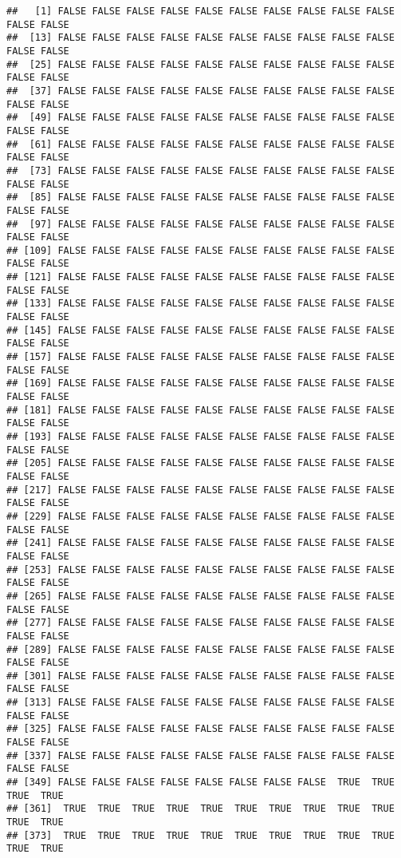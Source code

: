 \documentclass[
]{article}
\begin{document}
\begin{verbatim}
##   [1] FALSE FALSE FALSE FALSE FALSE FALSE FALSE FALSE FALSE FALSE FALSE FALSE
##  [13] FALSE FALSE FALSE FALSE FALSE FALSE FALSE FALSE FALSE FALSE FALSE FALSE
##  [25] FALSE FALSE FALSE FALSE FALSE FALSE FALSE FALSE FALSE FALSE FALSE FALSE
##  [37] FALSE FALSE FALSE FALSE FALSE FALSE FALSE FALSE FALSE FALSE FALSE FALSE
##  [49] FALSE FALSE FALSE FALSE FALSE FALSE FALSE FALSE FALSE FALSE FALSE FALSE
##  [61] FALSE FALSE FALSE FALSE FALSE FALSE FALSE FALSE FALSE FALSE FALSE FALSE
##  [73] FALSE FALSE FALSE FALSE FALSE FALSE FALSE FALSE FALSE FALSE FALSE FALSE
##  [85] FALSE FALSE FALSE FALSE FALSE FALSE FALSE FALSE FALSE FALSE FALSE FALSE
##  [97] FALSE FALSE FALSE FALSE FALSE FALSE FALSE FALSE FALSE FALSE FALSE FALSE
## [109] FALSE FALSE FALSE FALSE FALSE FALSE FALSE FALSE FALSE FALSE FALSE FALSE
## [121] FALSE FALSE FALSE FALSE FALSE FALSE FALSE FALSE FALSE FALSE FALSE FALSE
## [133] FALSE FALSE FALSE FALSE FALSE FALSE FALSE FALSE FALSE FALSE FALSE FALSE
## [145] FALSE FALSE FALSE FALSE FALSE FALSE FALSE FALSE FALSE FALSE FALSE FALSE
## [157] FALSE FALSE FALSE FALSE FALSE FALSE FALSE FALSE FALSE FALSE FALSE FALSE
## [169] FALSE FALSE FALSE FALSE FALSE FALSE FALSE FALSE FALSE FALSE FALSE FALSE
## [181] FALSE FALSE FALSE FALSE FALSE FALSE FALSE FALSE FALSE FALSE FALSE FALSE
## [193] FALSE FALSE FALSE FALSE FALSE FALSE FALSE FALSE FALSE FALSE FALSE FALSE
## [205] FALSE FALSE FALSE FALSE FALSE FALSE FALSE FALSE FALSE FALSE FALSE FALSE
## [217] FALSE FALSE FALSE FALSE FALSE FALSE FALSE FALSE FALSE FALSE FALSE FALSE
## [229] FALSE FALSE FALSE FALSE FALSE FALSE FALSE FALSE FALSE FALSE FALSE FALSE
## [241] FALSE FALSE FALSE FALSE FALSE FALSE FALSE FALSE FALSE FALSE FALSE FALSE
## [253] FALSE FALSE FALSE FALSE FALSE FALSE FALSE FALSE FALSE FALSE FALSE FALSE
## [265] FALSE FALSE FALSE FALSE FALSE FALSE FALSE FALSE FALSE FALSE FALSE FALSE
## [277] FALSE FALSE FALSE FALSE FALSE FALSE FALSE FALSE FALSE FALSE FALSE FALSE
## [289] FALSE FALSE FALSE FALSE FALSE FALSE FALSE FALSE FALSE FALSE FALSE FALSE
## [301] FALSE FALSE FALSE FALSE FALSE FALSE FALSE FALSE FALSE FALSE FALSE FALSE
## [313] FALSE FALSE FALSE FALSE FALSE FALSE FALSE FALSE FALSE FALSE FALSE FALSE
## [325] FALSE FALSE FALSE FALSE FALSE FALSE FALSE FALSE FALSE FALSE FALSE FALSE
## [337] FALSE FALSE FALSE FALSE FALSE FALSE FALSE FALSE FALSE FALSE FALSE FALSE
## [349] FALSE FALSE FALSE FALSE FALSE FALSE FALSE FALSE  TRUE  TRUE  TRUE  TRUE
## [361]  TRUE  TRUE  TRUE  TRUE  TRUE  TRUE  TRUE  TRUE  TRUE  TRUE  TRUE  TRUE
## [373]  TRUE  TRUE  TRUE  TRUE  TRUE  TRUE  TRUE  TRUE  TRUE  TRUE  TRUE  TRUE

\end{verbatim}
\end{document}
